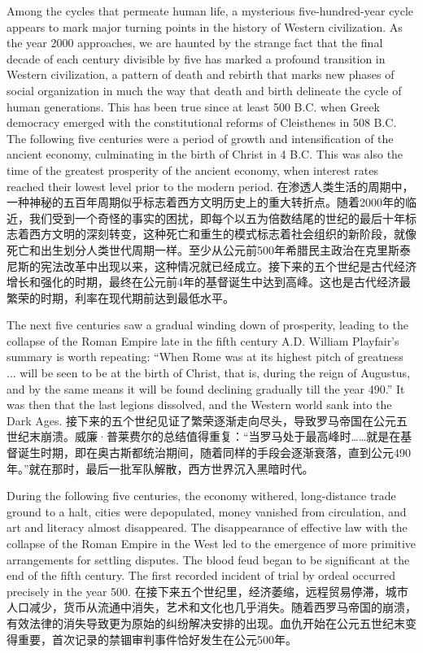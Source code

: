 \begin{Parallel}{97mm}{45mm}
  \ParallelLText
  {Among the cycles that permeate human life, a mysterious five-hundred-year cycle appears to mark major turning points in the history of Western civilization. As the year 2000 approaches, we are haunted by the strange fact that the final decade of each century divisible by five has marked a profound transition in Western civilization, a pattern of death and rebirth that marks new phases of social organization in much the way that death and birth delineate the cycle of human generations. This has been true since at least 500 B.C. when Greek democracy emerged with the constitutional reforms of Cleisthenes in 508 B.C. The following five centuries were a period of growth and intensification of the ancient economy, culminating in the birth of Christ in 4 B.C. This was also the time of the greatest prosperity of the ancient economy, when interest rates reached their lowest level prior to the modern period. }  
  \ParallelRText
  {\small 在渗透人类生活的周期中，一种神秘的五百年周期似乎标志着西方文明历史上的重大转折点。随着2000年的临近，我们受到一个奇怪的事实的困扰，即每个以五为倍数结尾的世纪的最后十年标志着西方文明的深刻转变，这种死亡和重生的模式标志着社会组织的新阶段，就像死亡和出生划分人类世代周期一样。至少从公元前500年希腊民主政治在克里斯泰尼斯的宪法改革中出现以来，这种情况就已经成立。接下来的五个世纪是古代经济增长和强化的时期，最终在公元前4年的基督诞生中达到高峰。这也是古代经济最繁荣的时期，利率在现代期前达到最低水平。}
  \ParallelPar

  \ParallelLText
  {The next five centuries saw a gradual winding down of prosperity, leading to the collapse of the Roman Empire late in the fifth century A.D. William Playfair's summary is worth repeating: “When Rome was at its highest pitch of greatness ... will be seen to be at the birth of Christ, that is, during the reign of Augustus, and by the same means it will be found declining gradually till the year 490.” It was then that the last legions dissolved, and the Western world sank into the Dark Ages. }  
  \ParallelRText
  {\small 接下来的五个世纪见证了繁荣逐渐走向尽头，导致罗马帝国在公元五世纪末崩溃。威廉·普莱费尔的总结值得重复：“当罗马处于最高峰时……就是在基督诞生时期，即在奥古斯都统治期间，随着同样的手段会逐渐衰落，直到公元490年。”就在那时，最后一批军队解散，西方世界沉入黑暗时代。}
  \ParallelPar

  \ParallelLText
  {During the following five centuries, the economy withered, long-distance trade ground to a halt, cities were depopulated, money vanished from circulation, and art and literacy almost disappeared. The disappearance of effective law with the collapse of the Roman Empire in the West led to the emergence of more primitive arrangements for settling disputes. The blood feud began to be significant at the end of the fifth century. The first recorded incident of trial by ordeal occurred precisely in the year 500.  }  
  \ParallelRText
  {\small 在接下来五个世纪里，经济萎缩，远程贸易停滞，城市人口减少，货币从流通中消失，艺术和文化也几乎消失。随着西罗马帝国的崩溃，有效法律的消失导致更为原始的纠纷解决安排的出现。血仇开始在公元五世纪末变得重要，首次记录的禁锢审判事件恰好发生在公元500年。}
  \ParallelPar


\end{Parallel}
